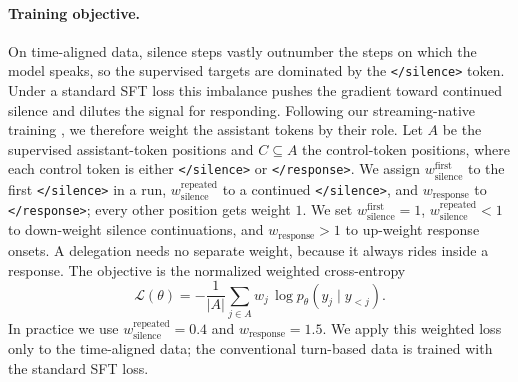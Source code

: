 \documentclass{llmxive}
\begin{document}
\paragraph{\textbf{Training objective.}}
On time-aligned data, silence steps vastly outnumber the steps on which the model speaks, so the supervised targets are dominated by the \texttt{</silence>} token. Under a standard SFT loss this imbalance pushes the gradient toward continued silence and dilutes the signal for responding. Following our streaming-native training \cite{yao2026harnessingstreamingvideowild}, we therefore weight the assistant tokens by their role. Let $A$ be the supervised assistant-token positions and $C \subseteq A$ the control-token positions, where each control token is either \texttt{</silence>} or \texttt{</response>}. We assign $w^{\text{first}}_{\text{silence}}$ to the first \texttt{</silence>} in a run, $w^{\text{repeated}}_{\text{silence}}$ to a continued \texttt{</silence>}, and $w_{\text{response}}$ to \texttt{</response>}; every other position gets weight $1$. We set $w^{\text{first}}_{\text{silence}}=1$, $w^{\text{repeated}}_{\text{silence}}<1$ to down-weight silence continuations, and $w_{\text{response}}>1$ to up-weight response onsets. A delegation needs no separate weight, because it always rides inside a response. The objective is the normalized weighted cross-entropy
\begin{equation}
\mathcal{L}(\theta) = -\frac{1}{|A|} \sum_{j \in A} w_j \, \log p_\theta(y_j \mid y_{<j}).
\end{equation}
In practice we use $w^{\text{repeated}}_{\text{silence}}=0.4$ and $w_{\text{response}}=1.5$. We apply this weighted loss only to the time-aligned data; the conventional turn-based data is trained with the standard SFT loss.
\end{document}
